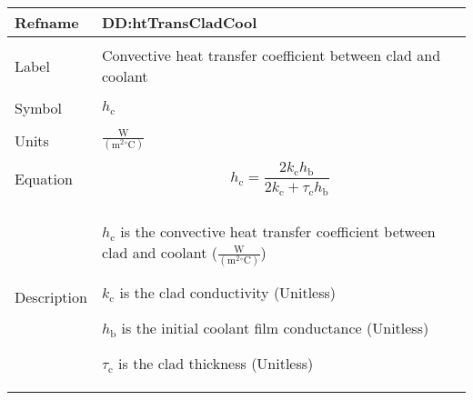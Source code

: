 \documentclass[12pt]{article}
\begin{document}
\begin{minipage}{\textwidth}
\begin{tabular}{>{\raggedright}p{}>{\raggedright\arraybackslash}p{}}
\toprule \textbf{Refname} & \textbf{DD:htTransCladCool}
\label{DD:htTransCladCool}
\\ \midrule \\
Label & Convective heat transfer coefficient between clad and coolant
        
\\ \midrule \\
Symbol & ${h_{\text{c}}}$
         
\\ \midrule \\
Units & $\frac{\text{W}}{(\text{m}^{2}{}^{\circ}\text{C})}$
        
\\ \midrule \\
Equation & \begin{displaymath}
           {h_{\text{c}}}=\frac{2 {k_{\text{c}}} {h_{\text{b}}}}{2 {k_{\text{c}}}+{τ_{\text{c}}} {h_{\text{b}}}}
           \end{displaymath}
\\ \midrule \\
Description & \begin{symbDescription}
              \item{${h_{\text{c}}}$ is the convective heat transfer coefficient between clad and coolant ($\frac{\text{W}}{(\text{m}^{2}{}^{\circ}\text{C})}$)}
              \item{${k_{\text{c}}}$ is the clad conductivity (Unitless)}
              \item{${h_{\text{b}}}$ is the initial coolant film conductance (Unitless)}
              \item{${τ_{\text{c}}}$ is the clad thickness (Unitless)}
              \end{symbDescription}
\\ \bottomrule
\end{tabular}
\end{minipage}
\end{document}
